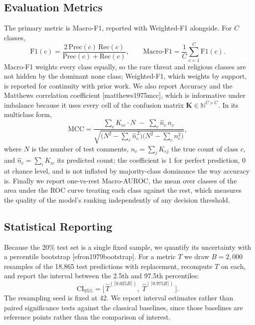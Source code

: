 \documentclass[11pt,a4paper]{article}
\def\citep#1{[#1]}%
\def\emph#1{#1}%
\begin{document}
\subsection{Evaluation Metrics}
\label{sec:metrics}

The primary metric is Macro-F1, reported with Weighted-F1 alongside. For $C$ classes,
\begin{equation}
\mathrm{F1}(c) = \frac{2\,\mathrm{Prec}(c)\,\mathrm{Rec}(c)}{\mathrm{Prec}(c) + \mathrm{Rec}(c)},
\qquad
\text{Macro-F1} = \frac{1}{C}\sum_{c=1}^{C} \mathrm{F1}(c).
\label{eq:macrof1}
\end{equation}
Macro-F1 weights every class equally, so the rare \emph{threat} and \emph{religious} classes are not hidden by the dominant \emph{none} class; Weighted-F1, which weights by support, is reported for continuity with prior work. We also report Accuracy and the Matthews correlation coefficient \citep{matthews1975mcc}, which is informative under imbalance because it uses every cell of the confusion matrix $\mathbf{K} \in \mathbb{N}^{C \times C}$. In its multiclass form,
\begin{equation}
\mathrm{MCC} =
\frac{\sum_{c} K_{cc} \cdot N \;-\; \sum_{c} \hat{n}_c\, n_c}
{\sqrt{\big(N^2 - \sum_{c} \hat{n}_c^{\,2}\big)\big(N^2 - \sum_{c} n_c^{2}\big)}},
\label{eq:mcc}
\end{equation}
where $N$ is the number of test comments, $n_c = \sum_{j} K_{cj}$ the true count of class $c$, and $\hat{n}_c = \sum_{i} K_{ic}$ its predicted count; the coefficient is $1$ for perfect prediction, $0$ at chance level, and is not inflated by majority-class dominance the way accuracy is. Finally we report one-vs-rest Macro-AUROC, the mean over classes of the area under the ROC curve treating each class against the rest, which measures the quality of the model's ranking independently of any decision threshold.

\subsection{Statistical Reporting}
\label{sec:stats}

Because the 20\% test set is a single fixed sample, we quantify its uncertainty with a percentile bootstrap \citep{efron1979bootstrap}. For a metric $T$ we draw $B = 2{,}000$ resamples of the 18{,}865 test predictions with replacement, recompute $T$ on each, and report the interval between the 2.5th and 97.5th percentiles:
\begin{equation}
\mathrm{CI}_{95\%} = \big[\, \hat{T}^{(\lceil 0.025 B \rceil)},\; \hat{T}^{(\lceil 0.975 B \rceil)} \,\big].
\label{eq:bootstrap}
\end{equation}
The resampling seed is fixed at 42. We report interval estimates rather than paired significance tests against the classical baselines, since those baselines are reference points rather than the comparison of interest.
\end{document}
